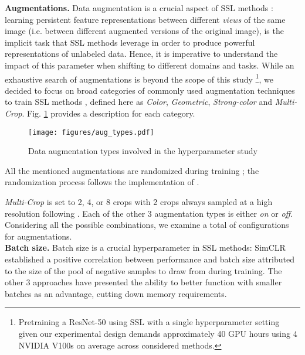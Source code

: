 \documentclass[times,twocolumn,final]{elsarticle}
\begin{document}
\noindent\textbf{Augmentations. }
Data augmentation is a crucial aspect of SSL methods \citep{chen2020simple}: learning persistent feature representations between different \textit{views} of the same image (i.e. between different augmented versions of the original image), is the implicit task that SSL methods leverage in order to produce powerful representations of unlabeled data.
Hence, it is imperative to understand the impact of this parameter when shifting to different domains and tasks. While an exhaustive search of augmentations is beyond the scope of this study \footnote{Pretraining a ResNet-50 using SSL with a single hyperparameter setting given our experimental design demands approximately 40 GPU hours using 4 NVIDIA V100s on average across considered methods.}, we decided to focus on broad categories of commonly used augmentation techniques to train SSL methods \citep{caron2021emerging,chen2020simple,he2020momentum}, defined here as \textit{Color}, \textit{Geometric}, \textit{Strong-color} and \textit{Multi-Crop}. Fig. \ref{fig:aug_types} provides a description for each category.

\begin{figure}[ht]
\texttt{[image: figures/aug\_types.pdf]}
\caption{Data augmentation types involved in the hyperparameter study}
\label{fig:aug_types}
\end{figure}

All the mentioned augmentations are randomized during training \citep{randaugment}; the randomization process follows the implementation of \cite{goyal2021self}.

\textit{Multi-Crop} is set to 2, 4, or 8 crops with 2 crops always sampled at a high resolution following \cite{caron2020unsupervised}. Each of the other 3 augmentation types is either \textit{on} or \textit{off}. Considering all the possible combinations, we examine a total of  configurations for augmentations.
\\
\noindent\textbf{Batch size. }
Batch size is a crucial hyperparameter in SSL methods: SimCLR \citep{chen2020simple} established a positive correlation between performance and batch size attributed to the size of the pool of negative samples to draw from during training. The other 3 approaches have presented the ability to better function with smaller batches as an advantage, cutting down memory requirements. 
\end{document}
